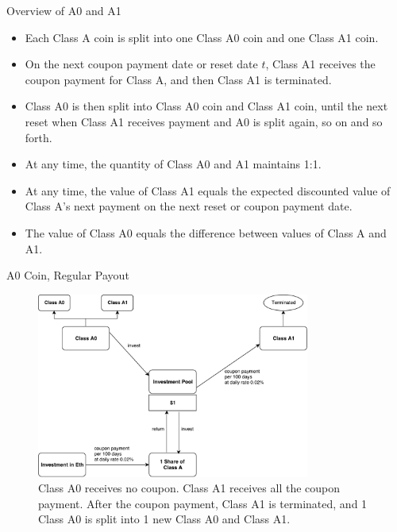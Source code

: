 \documentclass[notes=show, beamer, handout]{beamer}
\begin{document}
\begin{frame}{Overview of A0 and A1}

\begin{itemize}

\item Each Class A coin is split into one Class A0 coin and one Class A1 coin.
\item On the next coupon payment date or reset date $t$, Class A1 receives the coupon payment for Class A, and then Class A1 is terminated.
\item Class A0 is then split into Class A0 coin and Class A1 coin, until the next reset when Class A1 receives payment and A0 is split again, so on and so forth.
\item  At any time, the quantity of Class A0 and A1 maintains 1:1.
\item At any time, the value of Class A1 equals the expected discounted value of Class A's next payment on the next reset or coupon payment date.
\item The value of Class A0 equals the difference between values of Class A and A1.


\end{itemize}

\end{frame}


\begin{frame}{A0 Coin, Regular Payout}

\begin{figure}
\includegraphics[width=0.8\textwidth]{A0_periodic.pdf}
\caption{\footnotesize  Class A0 receives no coupon.  Class A1 receives all the coupon payment. After the coupon payment, Class A1 is terminated, and 1 Class A0 is split into 1 new Class A0 and Class A1.}
\end{figure}

\end{frame}
\end{document}
